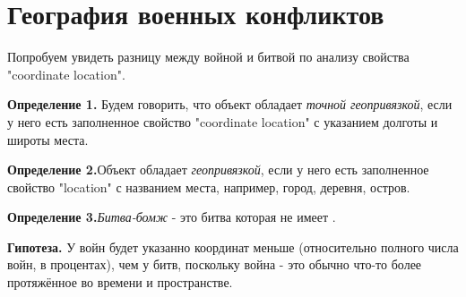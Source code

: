 \section{География военных конфликтов}


Попробуем увидеть разницу между войной и битвой по анализу свойства "coordinate location".

\textbf{Определение 1.} Будем говорить, что объект обладает \textit{точной геопривязкой}, если у него есть заполненное свойство "coordinate location" с указанием долготы и широты места.

\textbf{Определение 2.}Объект обладает \textit{геопривязкой}, если у него есть заполненное свойство "location" с названием места, например, город, деревня, остров.

\textbf{Определение 3.}\textit{Битва-бомж} - это битва которая не имеет .

\textbf{Гипотеза.} У войн будет указанно координат меньше (относительно полного числа войн, в процентах), чем у битв, поскольку война - это обычно что-то более протяжённое во времени и пространстве.

